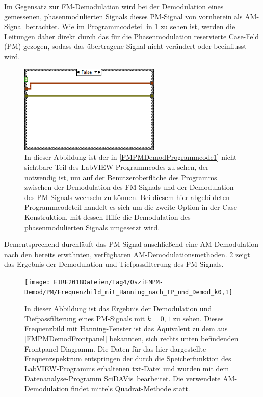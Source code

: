 \documentclass[
a4paper,
12pt,
pagesize,
ngerman
]{scrartcl}
\begin{document}
	Im Gegensatz zur FM-Demodulation wird bei der Demodulation eines gemessenen, phasenmodulierten Signals dieses PM-Signal von vornherein als AM-Signal betrachtet.
	Wie im Programmcodeteil in \cref{FMPMDemodProgrammcode2} zu sehen ist, werden die Leitungen daher direkt durch das für die Phasenmodulation reservierte Case-Feld (\glqq PM\grqq ) gezogen, sodass das übertragene Signal nicht verändert oder beeinflusst wird.
	
	\begin{figure}[H]
		\centering
		\includegraphics[width=0.6\textwidth]{EIRE2018Dateien/Tag4/OsziFMPM-Demod/PM/OsziPlusFMPMd5}
		\caption{In dieser Abbildung ist der in \cref{FMPMDemodProgrammcode1} nicht sichtbare Teil des LabVIEW-Programmcodes zu sehen, der notwendig ist, um auf der Benutzeroberfläche des Programms zwischen der Demodulation des FM-Signals und der Demodulation des PM-Signals wechseln zu können. Bei diesem hier abgebildeten Programmcodeteil handelt es sich um die zweite Option in der Case-Konstruktion, mit dessen Hilfe die Demodulation des phasenmodulierten Signals umgesetzt wird.}
		\label{FMPMDemodProgrammcode2}
	\end{figure}
	
	\noindent Dementsprechend durchläuft das PM-Signal anschließend eine AM-Demodulation nach den bereits erwähnten, verfügbaren AM-Demodulationsmethoden.
	\cref{PMDiagramm} zeigt das Ergebnis der Demodulation und Tiefpassfilterung des PM-Signals.
	
	\begin{figure}[H] %
		\centering
		\texttt{[image: EIRE2018Dateien/Tag4/OsziFMPM-Demod/PM/Frequenzbild\_mit\_Hanning\_nach\_TP\_und\_Demod\_k0,1]}
		\caption{In dieser Abbildung ist das Ergebnis der Demodulation und Tiefpassfilterung eines PM-Signals mit $k=0,1$ zu sehen. Dieses Frequenzbild mit Hanning-Fenster ist das Äquivalent zu dem aus \cref{FMPMDemodFrontpanel} bekannten, sich rechts unten befindenden Frontpanel-Diagramm. Die Daten für das hier dargestellte Frequenzspektrum entspringen der durch die Speicherfunktion des LabVIEW-Programms erhaltenen txt-Datei und wurden mit dem Datenanalyse-Programm \glqq SciDAVis\grqq\ bearbeitet. Die verwendete AM-Demodulation findet mittels \glqq Quadrat\grqq -Methode statt.}
		\label{PMDiagramm}
	\end{figure}
	
\end{document}
